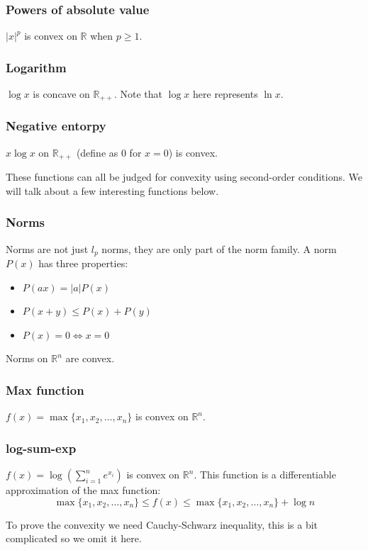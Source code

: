\documentclass[lang=en,color=blue,mode=fancy,titlestyle=hang]{elegantbook}
\begin{document}
\subsubsection{Powers of absolute value} $|x|^p$ is convex on $\mathbb{R}$ when $p \geq 1$.

\subsubsection{Logarithm} $\log x$ is concave on $\mathbb{R}_{++}$. Note that $\log x$ here
represents $\ln x$.

\subsubsection{Negative entorpy} $x\log x$ on $\mathbb{R}_{++}$ (define as 0 for $x = 0$)
is convex.

These functions can all be judged for convexity using second-order conditions. We will
talk about a few interesting functions below.

\subsubsection{Norms} Norms are not just $l_p$ norms, they are only part of the norm family.
A norm $P(x)$ has three properties:
\begin{itemize}
  \item $P(ax) = |a|P(x)$
  \item $P(x + y) \leq P(x) + P(y)$
  \item $P(x) = 0 \Leftrightarrow x = 0$
\end{itemize}

Norms on $\mathbb{R}^n$ are convex.

\subsubsection{Max function} $f(x) = \max\{x_1, x_2, \ldots, x_n\}$ is convex on $\mathbb{R}^n$.

\subsubsection{log-sum-exp} $f(x) = \log(\sum_{i=1}^{n}e^{x_i})$ is convex on $\mathbb{R}^n$.
This function is a differentiable approximation of the max function:
\[
\max\{x_1, x_2, \ldots, x_n\} \leq f(x) \leq \max\{x_1, x_2, \ldots, x_n\} + \log n
\]

To prove the convexity we need Cauchy-Schwarz inequality, this is a bit complicated so we
omit it here.
\end{document}
